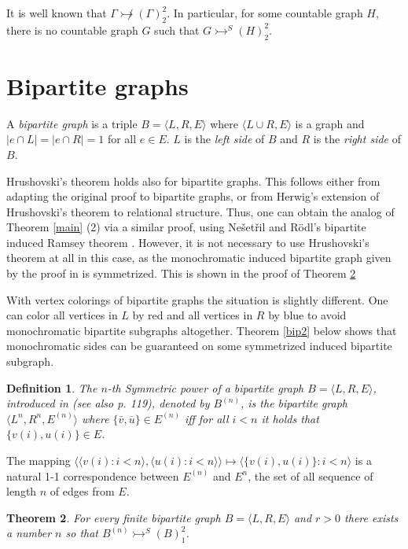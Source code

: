 \documentclass[11pt]{amsart}
\newcommand{\ars}{\rightarrowtail}
\newcommand{\rng}{\rangle}
\newcommand{\lng}{\langle}
\newtheorem{theorem}{Theorem}[section]
\newtheorem{definition}[theorem]{Definition}
\begin{document}
It is well known \cite{EHP} that $\Gamma \not\ars (\Gamma)^2_2$. In
particular, for some countable graph $H$, there is no countable graph
$G$ such that $G\ars^S(H)^2_2$. 


\section{Bipartite graphs}



A \emph{bipartite graph} is a triple $B=\lng L,R,E\rng$ where $\lng L\cup R,
E\rng$ is a graph and  $|e\cap L|=|e\cap R|=1$ for all $e\in E$. $L$
is the \emph{left side} of $B$ and $R$ is the \emph{ right side} of
$B$.

Hrushovski's theorem holds also for bipartite graphs. This follows
either from adapting the original proof to bipartite graphs, or from
Herwig's extension \cite{H} of Hrushovski's theorem to relational
structure. Thus, one can obtain the analog of Theorem \ref{main} (2)
via a similar proof, using Ne\v set\v ril and R\" odl's bipartite
induced Ramsey theorem \cite{NR76}. However, it is not necessary to
use Hrushovski's theorem at all in this case, as the monochromatic
induced bipartite graph given by the proof in \cite{NR76} is
symmetrized. This is shown in the proof of Theorem \ref{bip1}

With vertex colorings of bipartite graphs the situation is slightly
different. One can  color all vertices in $L$ by red and all
vertices in $R$ by blue to avoid monochromatic bipartite
subgraphs altogether. Theorem \ref{bip2} below shows that
monochromatic sides can  be guaranteed on some symmetrized induced
bipartite subgraph.

\begin{definition}
  The \emph{$n$-th Symmetric power} of a bipartite graph $B=\lng L,R,
  E\rng$, introduced in \cite{NR76} (see also \cite{GRS} p. 119),  denoted by
  $B^{(n)}$, is the bipartite graph $\lng L^n, R^n, E^{(n)}\rng$ where
  $\{\bar v, \bar u\}\in E^{(n)}$ iff for all $i<n$ it holds that
  $\{v(i),u(i)\}\in E$.
\end{definition}

The mapping $\lng \lng v(i):i<n\rng, \lng u(i):i<n\rng\rng\mapsto \lng
\{v(i),u(i)\}:i<n\rng$ is a natural 1-1 correspondence between
$E^{(n)}$ and $E^n$, the set of all sequence of length $n$ of edges
from $E$.

\begin{theorem}\label{bip1}
  For every finite bipartite graph $B=\lng L, R, E\rng$ and $r>0$
  there exists a number $n$ so that $B^{(n)}\ars^S (B)^2_1$.
\end{theorem}
\end{document}
